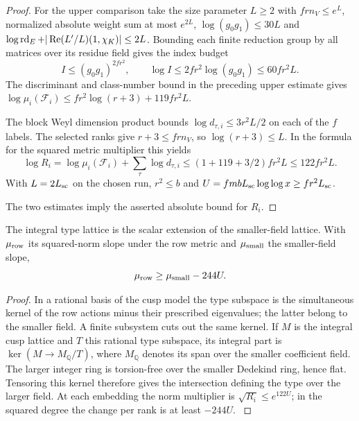 \begin{proof}
For the upper comparison take the size parameter \(L\ge2\)
with \(frn_V\le e^L\), normalized absolute weight sum at
most \(e^{2L}\), \(\log(g_0g_1)\le30L\) and
\(\log\operatorname{rd}_E+|\operatorname{Re}(L'/L)(1,\chi_K)|\le2L\).
Bounding each finite reduction group by all matrices over its
residue field gives the index budget
\[
 I\le(g_0g_1)^{2fr^2},\qquad
 \log I\le2fr^2\log(g_0g_1)\le60fr^2L .
\]
The discriminant and class-number bound in the preceding
upper estimate gives
\(\log\mu_i(\mathcal F_i)\le fr^2\log(r+3)+119fr^2L\).

The block Weyl dimension product bounds
\(\log d_{\tau,i}\le 3r^2 L/2\) on each of the \(f\) labels.
The selected ranks give \(r+3\le frn_V\), so
\(\log(r+3)\le L\). In the formula for the squared metric multiplier this yields
\[
 \log R_i=\log\mu_i(\mathcal F_i)+\sum_\tau\log d_{\tau,i}
    \le (1+119+3/2)fr^2L\le122fr^2L .
\] With \(L=2L_{\rm sc}\)
on the chosen run, \(r^2\le b\) and
\(U=fmbL_{\rm sc}\log\log x\ge fr^2 L_{\rm sc}\).

The two estimates imply the asserted absolute bound for \(R_i\).
\end{proof}

\begin{lemma}\label{lem:covolume-integral-descent}
The integral type lattice is the scalar extension of the
smaller-field lattice. With \(\mu_{\rm row}\) its squared-norm slope under the row metric and \(\mu_{\rm small}\) the smaller-field slope,
\[
 \mu_{\rm row}\ge\mu_{\rm small}-244U.
\]

\end{lemma}
\begin{proof}
In a rational basis of the cusp model the type subspace is
the simultaneous kernel of the row actions minus their prescribed
eigenvalues; the latter belong to the smaller field. A finite
subsystem cuts out the same kernel. If \(M\) is the integral
cusp lattice and \(T\) this rational type subspace, its integral
part is \(\ker(M\to M_{\mathbb Q}/T)\), where \(M_{\mathbb Q}\)
denotes its span over the smaller coefficient field. The larger integer ring is torsion-free
over the smaller Dedekind ring, hence flat. Tensoring this kernel
therefore gives the intersection defining the type over the
larger field. At each embedding the norm multiplier is
\(\sqrt{R_i}\le e^{122U}\); in the squared degree the change per
rank is at least \(-244U\). \label{cor:covolume-component-transfer-21}
\end{proof}

